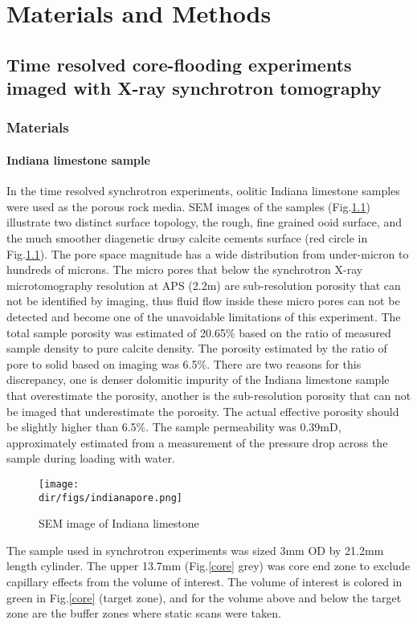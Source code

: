 \chapter{Materials and Methods}
\section{Time resolved core-flooding experiments imaged with X-ray synchrotron tomography}
\subsection{Materials}
\subsubsection{Indiana limestone sample}
In the time resolved synchrotron experiments, oolitic Indiana limestone samples were used as the porous rock media. SEM images of the samples (Fig.\ref{sempore}) illustrate two distinct surface topology, the rough, fine grained ooid surface, and the much smoother diagenetic drusy calcite cements surface (red circle in Fig.\ref{sempore}). The pore space magnitude has a wide distribution from under-micron to hundreds of microns. The micro pores that below the synchrotron X-ray microtomography resolution at APS (2.2\textmu m) are sub-resolution porosity that can not be identified by imaging, thus fluid flow inside these micro pores can not be detected and become one of the unavoidable limitations of this experiment. The total sample porosity was estimated of 20.65\% based on the ratio of measured sample density to pure calcite density. The porosity estimated by the ratio of pore to solid based on imaging was 6.5\%. There are two reasons for this discrepancy, one is denser dolomitic impurity of the Indiana limestone sample that overestimate the porosity, another is the sub-resolution porosity that can not be imaged that underestimate the porosity. The actual effective porosity should be slightly higher than 6.5\%. The sample permeability was 0.39mD, approximately estimated from a measurement of the pressure drop across the sample during loading with water.

\begin{figure}[htbp]
  \centering
  \texttt{[image: \\dir/figs/indianapore.png]}
  \caption{SEM image of Indiana limestone}
  \label{sempore}
\end{figure}

The sample used in synchrotron experiments was sized 3mm OD by 21.2mm length cylinder. The upper 13.7mm (Fig.\ref{core} grey) was core end zone to exclude capillary effects from the volume of interest. The volume of interest is colored in green in Fig.\ref{core} (target zone), and for the volume above and below the target zone are the buffer zones where static scans were taken.


